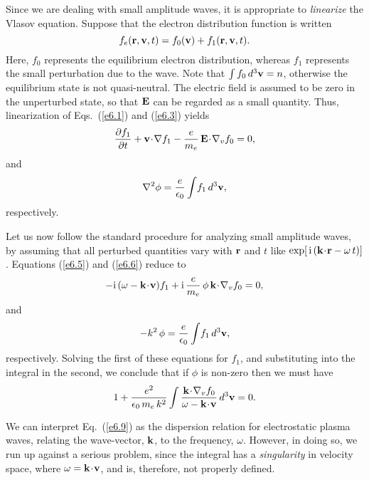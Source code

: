 Since we are dealing with small amplitude waves, it is appropriate to
{\em linearize}\/  the Vlasov equation. Suppose that the electron
distribution function is written
\begin{equation}
f_e({\bf r}, {\bf v}, t) = f_0({\bf v}) + f_1({\bf r}, {\bf v}, t).
\end{equation}
Here, $f_0$ represents the equilibrium electron distribution, whereas $f_1$
represents the small perturbation due to the wave. Note that $\int f_0\,d^3{\bf v}
=n$, otherwise the equilibrium state is not quasi-neutral. The electric
field is assumed to be zero in the unperturbed state, so that ${\bf E}$
can be regarded as a small quantity. Thus, linearization of
Eqs.~(\ref{e6.1}) and (\ref{e6.3}) yields
\begin{equation}\label{e6.5}
\frac{\partial f_1}{\partial t} + {\bf v}\!\cdot\!\nabla f_1
- \frac{e}{m_e}\,{\bf E}\!\cdot\!\nabla_v f_0 =0,
\end{equation}
and
\begin{equation}\label{e6.6}
\nabla^2\phi = \frac{e}{\epsilon_0}\int\! f_1\,d^3{\bf v},
\end{equation}
respectively.

Let us now follow the standard procedure for analyzing small amplitude
waves, by assuming that all perturbed quantities vary with
${\bf r}$ and $t$ like $\exp[\,{\rm i}\,({\bf k}\!\cdot\!{\bf r} - \omega\,t)]$.
Equations (\ref{e6.5}) and (\ref{e6.6}) reduce to
\begin{equation}
-{\rm i}\,(\omega - {\bf k}\!\cdot\!{\bf v}) f_1
+ {\rm i}\,\frac{e}{m_e}\,\phi \,{\bf k}\!\cdot\!\nabla_v f_0 = 0,
\end{equation}
and
\begin{equation}
-k^2\,\phi = \frac{e}{\epsilon_0} \int\! f_1\,d^3{\bf v},
\end{equation}
respectively. Solving the first of these equations for $f_1$, and substituting 
into the integral in the second, we conclude that if $\phi$ is non-zero
then we must have
\begin{equation}\label{e6.9}
1 + \frac{e^2}{\epsilon_0\,m_e\,k^2} \int\frac{ {\bf k}\!\cdot\!\nabla_v f_0}
{\omega - {\bf k}\!\cdot\!{\bf v}}\,d^3{\bf v} = 0.
\end{equation}

We can interpret Eq.~(\ref{e6.9}) as the dispersion relation for electrostatic plasma
waves, relating the wave-vector,  ${\bf k}$, to the frequency, $\omega$. 
However, in doing so, we run up against a serious problem, since the integral has
a {\em singularity}\/  in velocity space, where $\omega={\bf k}\!\cdot\!{\bf v}$,
and is, therefore, not properly defined.

